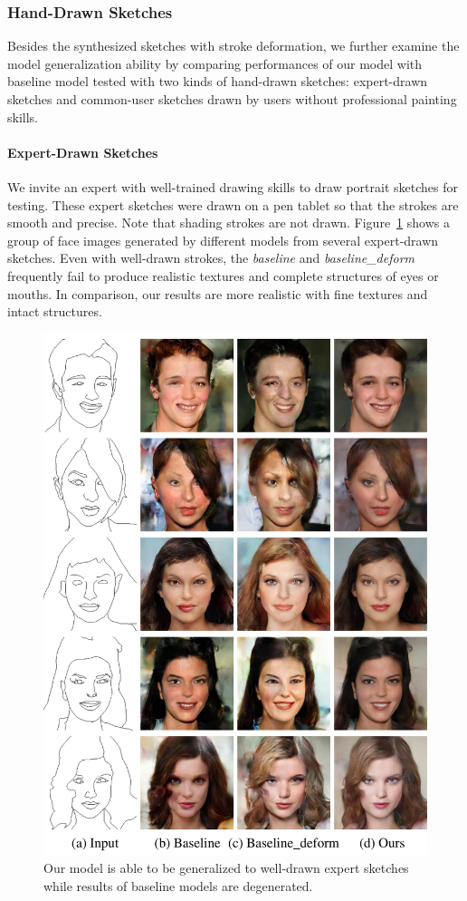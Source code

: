 \subsubsection{Hand-Drawn Sketches}
Besides the synthesized sketches with stroke deformation, we further examine the model generalization ability by comparing performances of our model with baseline model tested with two kinds of hand-drawn sketches: expert-drawn sketches and common-user sketches drawn by users without professional painting skills.

\paragraph{Expert-Drawn Sketches}
We invite an expert with well-trained drawing skills to draw portrait sketches for testing. 
These expert sketches were drawn on a pen tablet so that the strokes are smooth and precise. 
Note that shading strokes are not drawn. 
%
Figure~\ref{fig:expert_sketches} shows a group of face images generated by different models from several expert-drawn sketches. 
%
Even with well-drawn strokes, the \textit{baseline} and \textit{baseline\_deform} frequently fail to produce realistic textures and complete structures of eyes or mouths. 
%
In comparison, our results are more realistic with fine textures and intact structures. 

\begin{figure}
	\includegraphics[width=0.9\linewidth]{figs/expertsketches}
	\caption{Our model is able to be generalized to well-drawn expert sketches while results of baseline models are degenerated.}
	\label{fig:expert_sketches}
\end{figure}


